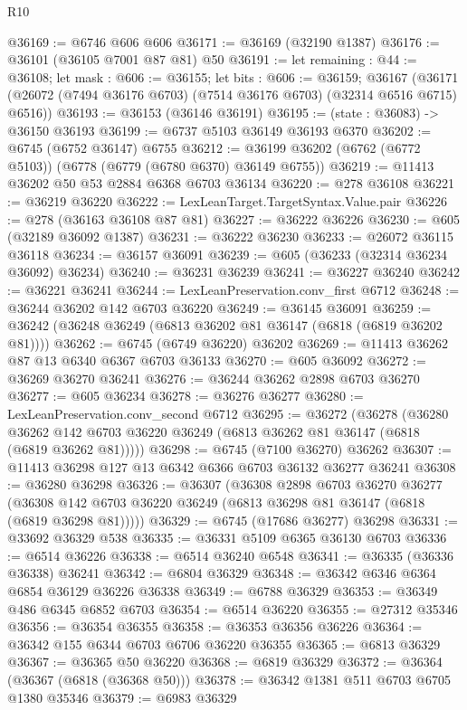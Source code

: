 \begin{lexlean}{R10}
\begin{coremodule}
@36169 := @6746 @606 @606
@36171 := @36169 (@32190 @1387)
@36176 := @36101 (@36105 @7001 @87 @81) @50
@36191 := let remaining : @44 := @36108;
  let mask : @606 := @36155;
  let bits : @606 := @36159;
  @36167 (@36171 (@26072 (@7494 @36176 @6703) (@7514 @36176 @6703) (@32314 @6516 @6715) @6516))
@36193 := @36153 (@36146 @36191)
@36195 := (state : @36083) -> @36150 @36193
@36199 := @6737 @5103 @36149 @36193 @6370
@36202 := @6745 (@6752 @36147) @6755
@36212 := @36199 @36202 (@6762 (@6772 @5103)) (@6778 (@6779 (@6780 @6370) @36149 @6755))
@36219 := @11413 @36202 @50 @53 @2884 @6368 @6703 @36134
@36220 := @278 @36108
@36221 := @36219 @36220
@36222 := LexLeanTarget.TargetSyntax.Value.pair
@36226 := @278 (@36163 @36108 @87 @81)
@36227 := @36222 @36226
@36230 := @605 (@32189 @36092 @1387)
@36231 := @36222 @36230
@36233 := @26072 @36115 @36118
@36234 := @36157 @36091
@36239 := @605 (@36233 (@32314 @36234 @36092) @36234)
@36240 := @36231 @36239
@36241 := @36227 @36240
@36242 := @36221 @36241
@36244 := LexLeanPreservation.conv_first @6712
@36248 := @36244 @36202 @142 @6703 @36220
@36249 := @36145 @36091
@36259 := @36242 (@36248 @36249 (@6813 @36202 @81 @36147 (@6818 (@6819 @36202 @81))))
@36262 := @6745 (@6749 @36220) @36202
@36269 := @11413 @36262 @87 @13 @6340 @6367 @6703 @36133
@36270 := @605 @36092
@36272 := @36269 @36270 @36241
@36276 := @36244 @36262 @2898 @6703 @36270
@36277 := @605 @36234
@36278 := @36276 @36277
@36280 := LexLeanPreservation.conv_second @6712
@36295 := @36272
    (@36278
      (@36280 @36262 @142 @6703 @36220 @36249 (@6813 @36262 @81 @36147 (@6818 (@6819 @36262 @81)))))
@36298 := @6745 (@7100 @36270) @36262
@36307 := @11413 @36298 @127 @13 @6342 @6366 @6703 @36132 @36277 @36241
@36308 := @36280 @36298
@36326 := @36307
    (@36308
      @2898
      @6703
      @36270
      @36277
      (@36308 @142 @6703 @36220 @36249 (@6813 @36298 @81 @36147 (@6818 (@6819 @36298 @81)))))
@36329 := @6745 (@17686 @36277) @36298
@36331 := @33692 @36329 @538
@36335 := @36331 @5109 @6365 @36130 @6703
@36336 := @6514 @36226
@36338 := @6514 @36240 @6548
@36341 := @36335 (@36336 @36338) @36241
@36342 := @6804 @36329
@36348 := @36342 @6346 @6364 @6854 @36129 @36226 @36338
@36349 := @6788 @36329
@36353 := @36349 @486 @6345 @6852 @6703
@36354 := @6514 @36220
@36355 := @27312 @35346
@36356 := @36354 @36355
@36358 := @36353 @36356 @36226
@36364 := @36342 @155 @6344 @6703 @6706 @36220 @36355
@36365 := @6813 @36329
@36367 := @36365 @50 @36220
@36368 := @6819 @36329
@36372 := @36364 (@36367 (@6818 (@36368 @50)))
@36378 := @36342 @1381 @511 @6703 @6705 @1380 @35346
@36379 := @6983 @36329

\end{coremodule}
\end{lexlean}
